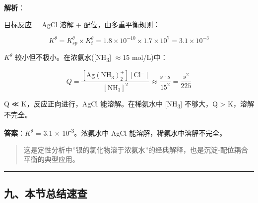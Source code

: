 \documentclass[a4paper,11pt]{ctexart}
\newcommand{\箭}{\ensuremath{\rightarrow}}
\newcommand{\左箭}{\ensuremath{\leftarrow}}
\newcommand{\上箭}{\ensuremath{\uparrow}}
\newcommand{\下箭}{\ensuremath{\downarrow}}
\newcommand{\衡}{\ensuremath{\rightleftharpoons}}
\newcommand{\双箭}{\ensuremath{\leftrightarrow}}
\newcommand{\约等于}{\ensuremath{\approx}}
\newcommand{\小于等于}{\ensuremath{\leq}}
\newcommand{\大于等于}{\ensuremath{\geq}}
\newcommand{\不等于}{\ensuremath{\neq}}
\newcommand{\西格马}{\ensuremath{\sigma}}
\newcommand{\派}{\ensuremath{\pi}}
\begin{document}
\textbf{解析}：

目标反应 = AgCl 溶解 + 配位，由多重平衡规则：

\[K^\theta = K_{sp}^\theta \times K_{\mathrm f}^\theta = 1.8 \times 10^{-10} \times 1.7 \times 10^7 = 3.1 \times 10^{-3}\]

\(K^\theta\) 较小但不极小。在浓氨水({[}NH\textsubscript{3}{]} \约等于 15 mol/L)中：

\[Q = \frac{[\mathrm{Ag(NH_3)_2^+}][\mathrm{Cl^-}]}{[\mathrm{NH_3}]^2} \approx \frac{s \cdot s}{15^2} = \frac{s^2}{225}\]

Q ≪ K，反应正向进行，AgCl 能溶解。在稀氨水中 {[}NH\textsubscript{3}{]} 不够大，Q \textgreater{} K，溶解不完全。

\textbf{答案}：\(K^\theta\) = 3.1 × 10\textsuperscript{-3}。浓氨水中 AgCl 能溶解，稀氨水中溶解不完全。

\begin{quote}
这是定性分析中''银的氯化物溶于浓氨水''的经典解释，也是沉淀-配位耦合平衡的典型应用。
\end{quote}

\begin{center}\rule{0.5\linewidth}{0.5pt}\end{center}

\subsection{九、本节总结速查}\label{ux4e5dux672cux8282ux603bux7ed3ux901fux67e5}
\end{document}
